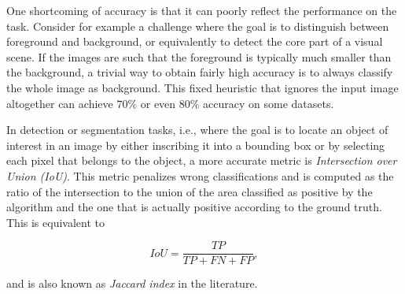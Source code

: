 One shortcoming of accuracy is that it can poorly reflect the performance on
the task. Consider for example a challenge where the goal is to distinguish
between foreground and background, or equivalently to detect the core part of a
visual scene. If the images are such that the foreground is typically much
smaller than the background, a trivial way to obtain fairly high accuracy is to
always classify the whole image as background. This fixed heuristic that
ignores the input image altogether can achieve $70\%$ or even $80\%$ accuracy
on some datasets.

In detection or segmentation tasks, i.e., where the goal is to locate an object
of interest in an image by either inscribing it into a bounding box or by
selecting each pixel that belongs to the object, a more accurate metric is
\emph{Intersection over Union (IoU)}. This metric penalizes wrong
classifications and is computed as the ratio of the intersection to the union
of the area classified as positive by the algorithm and the one that is
actually positive according to the ground truth. This is equivalent to

\begin{equation}\label{eq:iou}
    IoU = \frac{TP}{TP + FN + FP},
\end{equation}

\noindent and is also known as \emph{Jaccard index} in the literature.
